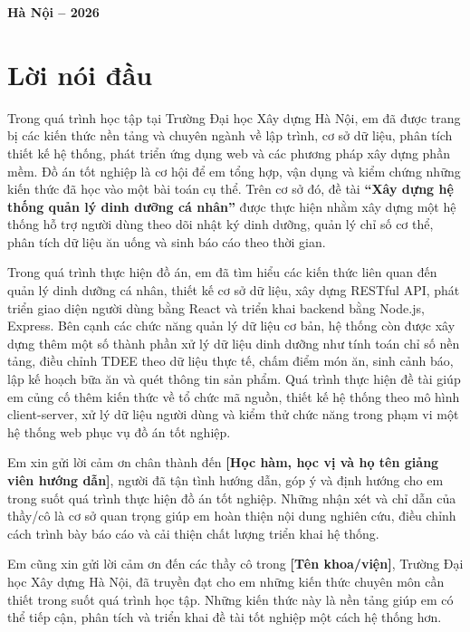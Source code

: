 \documentclass[12pt, a4paper]{report}
\begin{document}
\begin{titlepage}
\begin{center}
        \vfill
        
        {\fontsize{14pt}{16.8pt}\selectfont \textbf{Hà Nội -- 2026}}\\[1cm]
    \end{center}
    
    \restoregeometry
\end{titlepage}

\clearpage
{}

\chapter*{Lời nói đầu}


Trong quá trình học tập tại Trường Đại học Xây dựng Hà Nội, em đã được trang bị các kiến thức nền tảng và chuyên ngành về lập trình, cơ sở dữ liệu, phân tích thiết kế hệ thống, phát triển ứng dụng web và các phương pháp xây dựng phần mềm. Đồ án tốt nghiệp là cơ hội để em tổng hợp, vận dụng và kiểm chứng những kiến thức đã học vào một bài toán cụ thể. Trên cơ sở đó, đề tài \textbf{“Xây dựng hệ thống quản lý dinh dưỡng cá nhân”} được thực hiện nhằm xây dựng một hệ thống hỗ trợ người dùng theo dõi nhật ký dinh dưỡng, quản lý chỉ số cơ thể, phân tích dữ liệu ăn uống và sinh báo cáo theo thời gian.

Trong quá trình thực hiện đồ án, em đã tìm hiểu các kiến thức liên quan đến quản lý dinh dưỡng cá nhân, thiết kế cơ sở dữ liệu, xây dựng RESTful API, phát triển giao diện người dùng bằng React và triển khai backend bằng Node.js, Express. Bên cạnh các chức năng quản lý dữ liệu cơ bản, hệ thống còn được xây dựng thêm một số thành phần xử lý dữ liệu dinh dưỡng như tính toán chỉ số nền tảng, điều chỉnh TDEE theo dữ liệu thực tế, chấm điểm món ăn, sinh cảnh báo, lập kế hoạch bữa ăn và quét thông tin sản phẩm. Quá trình thực hiện đề tài giúp em củng cố thêm kiến thức về tổ chức mã nguồn, thiết kế hệ thống theo mô hình client-server, xử lý dữ liệu người dùng và kiểm thử chức năng trong phạm vi một hệ thống web phục vụ đồ án tốt nghiệp.

Em xin gửi lời cảm ơn chân thành đến \textbf{[Học hàm, học vị và họ tên giảng viên hướng dẫn]}, người đã tận tình hướng dẫn, góp ý và định hướng cho em trong suốt quá trình thực hiện đồ án tốt nghiệp. Những nhận xét và chỉ dẫn của thầy/cô là cơ sở quan trọng giúp em hoàn thiện nội dung nghiên cứu, điều chỉnh cách trình bày báo cáo và cải thiện chất lượng triển khai hệ thống.

Em cũng xin gửi lời cảm ơn đến các thầy cô trong \textbf{[Tên khoa/viện]}, Trường Đại học Xây dựng Hà Nội, đã truyền đạt cho em những kiến thức chuyên môn cần thiết trong suốt quá trình học tập. Những kiến thức này là nền tảng giúp em có thể tiếp cận, phân tích và triển khai đề tài tốt nghiệp một cách hệ thống hơn.
\end{document}
